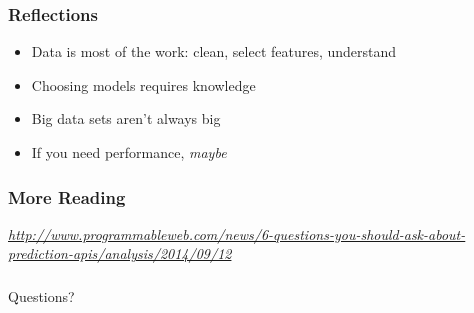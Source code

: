 \documentclass{beamer}
\newcommand\smallgray[1]{\textcolor{gray}{\footnotesize\it #1}}
\newcommand\prevwork[1]{\smallgray{#1}}
\newcommand\solo[1]{\centerline{#1}}
\newcommand\cimg[1]{\centerline{\texttt{[image: \#1]}}}
\newcommand\cimgsm[1]{\centerline{\texttt{[image: \#1]}}}
\begin{document}


\begin{frame}
  \frametitle{Reflections}

  \begin{itemize}
  \item Data is most of the work: clean, select features, understand
  \item Choosing models requires knowledge
  \item Big data sets aren't always big
  \item If you need performance, \textit{maybe}
  \end{itemize}

\end{frame}

\begin{frame}
  \frametitle{More Reading}

  \prevwork{\url{http://www.programmableweb.com/news/6-questions-you-should-ask-about-prediction-apis/analysis/2014/09/12}}
  
\end{frame}

\begin{frame}
  \frametitle{}

  Questions?
\end{frame}

\end{document}
